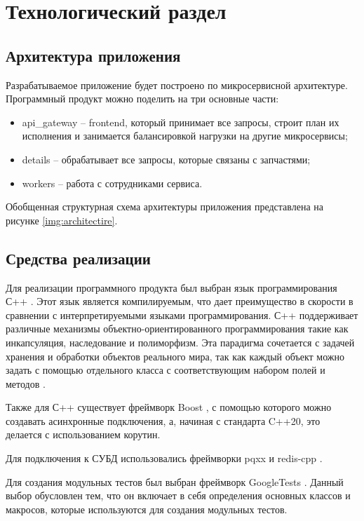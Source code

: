 \chapter{Технологический раздел}

\section{Архитектура приложения}

Разрабатываемое приложение будет построено по микросервисной архитектуре. Программный продукт можно поделить на три основные части:
\begin{itemize}
	\item api\_gateway -- frontend, который принимает все запросы, строит план их исполнения и занимается балансировкой нагрузки на другие микросервисы;
	\item details -- обрабатывает все запросы, которые связаны с запчастями;
	\item workers -- работа с сотрудниками сервиса.
\end{itemize}

Обобщенная структурная схема архитектуры приложения представлена на рисунке \ref{img:architectire}.


\section{Средства реализации}

Для реализации программного продукта был выбран язык программирования С++ \cite{cpp}. Этот язык является компилируемым, что дает преимущество в скорости в сравнении с интерпретируемыми языками программирования. С++ поддерживает различные механизмы объектно-ориентированного программирования такие как инкапсуляция, наследование и полиморфизм. Эта парадигма сочетается с задачей хранения и обработки объектов реального мира, так как каждый объект можно задать с помощью отдельного класса с соответствующим набором полей и методов \cite{oop}.

Также для С++ существует фреймворк Boost \cite{boost}, с помощью которого можно создавать асинхронные подключения, а, начиная с стандарта C++20, это делается с использованием корутин.

Для подключения к СУБД использовались фреймворки pqxx \cite{pqxx} и redis-cpp \cite{redis-cpp}.

Для создания модульных тестов был выбран фреймворк GoogleTests \cite{gtest}. Данный выбор обусловлен тем, что он включает в себя определения основных классов и макросов, которые используются для создания модульных тестов.


